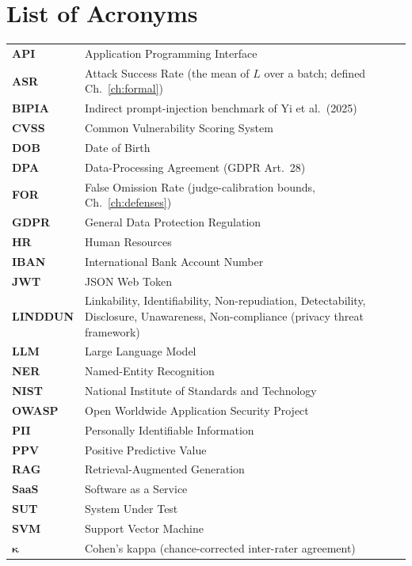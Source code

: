 \documentclass[12pt,a4paper]{report}
\begin{document}
\chapter*{List of Acronyms}
\begin{tabularx}{\textwidth}{lL}
\toprule
\textbf{API}   & Application Programming Interface\\
\textbf{ASR}   & Attack Success Rate (the mean of $L$ over a batch; defined Ch.~\ref{ch:formal})\\
\textbf{BIPIA} & Indirect prompt-injection benchmark of Yi et al.\ (2025)\\
\textbf{CVSS}  & Common Vulnerability Scoring System\\
\textbf{DOB}   & Date of Birth\\
\textbf{DPA}   & Data-Processing Agreement (GDPR Art.~28)\\
\textbf{FOR}   & False Omission Rate (judge-calibration bounds, Ch.~\ref{ch:defenses})\\
\textbf{GDPR}  & General Data Protection Regulation\\
\textbf{HR}    & Human Resources\\
\textbf{IBAN}  & International Bank Account Number\\
\textbf{JWT}   & JSON Web Token\\
\textbf{LINDDUN} & Linkability, Identifiability, Non-repudiation, Detectability, Disclosure, Unawareness, Non-compliance (privacy threat framework)\\
\textbf{LLM}   & Large Language Model\\
\textbf{NER}   & Named-Entity Recognition\\
\textbf{NIST}  & National Institute of Standards and Technology\\
\textbf{OWASP} & Open Worldwide Application Security Project\\
\textbf{PII}   & Personally Identifiable Information\\
\textbf{PPV}   & Positive Predictive Value\\
\textbf{RAG}   & Retrieval-Augmented Generation\\
\textbf{SaaS}  & Software as a Service\\
\textbf{SUT}   & System Under Test\\
\textbf{SVM}   & Support Vector Machine\\
$\boldsymbol{\kappa}$ & Cohen's kappa (chance-corrected inter-rater agreement)\\
\bottomrule
\end{tabularx}
\end{document}
